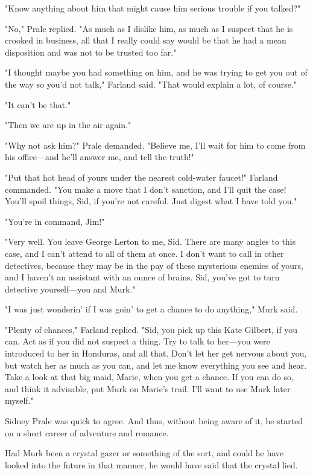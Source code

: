 \documentclass{novel}
\begin{document}
"Know anything about him that might cause him serious trouble if you talked?"

"No," Prale replied. "As much as I dislike him, as much as I suspect that he is crooked in business, all that I really could say would be that he had a mean disposition and was not to be trusted too far."

"I thought maybe you had something on him, and he was trying to get you out of the way so you'd not talk," Farland said. "That would explain a lot, of course."

"It can't be that."

"Then we are up in the air again."

"Why not ask him?" Prale demanded. "Believe me, I'll wait for him to come from his office---and he'll answer me, and tell the truth!"

"Put that hot head of yours under the nearest cold-water faucet!" Farland commanded. "You make a move that I don't sanction, and I'll quit the case! You'll spoil things, Sid, if you're not careful. Just digest what I have told you."

"You're in command, Jim!"

"Very well. You leave George Lerton to me, Sid. There are many angles to this case, and I can't attend to all of them at once. I don't want to call in other detectives, because they may be in the pay of these mysterious enemies of yours, and I haven't an assistant with an ounce of brains. Sid, you've got to turn detective yourself---you and Murk."

"I was just wonderin' if I was goin' to get a chance to do anything," Murk said.

"Plenty of chances," Farland replied. "Sid, you pick up this Kate Gilbert, if you can. Act as if you did not suspect a thing. Try to talk to her---you were introduced to her in Honduras, and all that. Don't let her get nervous about you, but watch her as much as you can, and let me know everything you see and hear. Take a look at that big maid, Marie, when you get a chance. If you can do so, and think it advisable, put Murk on Marie's trail. I'll want to use Murk later myself."

Sidney Prale was quick to agree. And thus, without being aware of it, he started on a short career of adventure and romance.

Had Murk been a crystal gazer or something of the sort, and could he have looked into the future in that manner, he would have said that the crystal lied.
\end{document}
